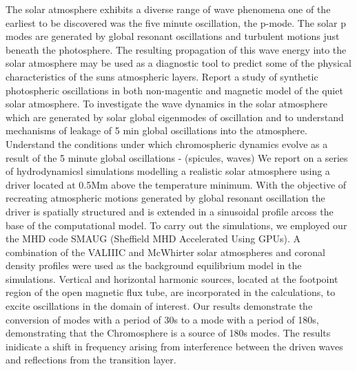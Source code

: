 \documentclass{aa}
\begin{document}
  \abstract
   { The solar atmosphere exhibits a diverse range of wave phenomena one of the earliest to be discovered was the five minute oscillation, the p-mode. The solar p modes are generated by global resonant oscillations and turbulent motions just beneath the photosphere. The resulting propagation of this wave energy into the solar atmosphere may be used as a diagnostic tool to predict some of the physical characteristics of the  suns atmospheric layers. Report a study of synthetic photospheric oscillations in both non-magentic and magnetic  model of the quiet solar atmosphere.}
   {To investigate the wave dynamics in the solar atmosphere which are generated by solar global eigenmodes of oscillation and to understand mechanisms of leakage of 5 min global oscillations into the atmosphere. Understand the conditions under which chromospheric dynamics evolve as a result of the 5 minute global oscillations - (spicules, waves)
}
   {  We report on a series of hydrodynamicsl simulations modelling a realistic solar atmosphere using a driver located at 0.5Mm above the temperature minimum. With the objective of recreating atmospheric motions generated by global resonant oscillation the driver is spatially structured and is extended in a sinusoidal profile arcoss the base of the computational model.  To carry out the simulations, we employed our the MHD code SMAUG (Sheffield MHD Accelerated Using GPUs). A combination of the VALIIIC and McWhirter solar atmospheres and coronal density profiles were used as the background equilibrium
model in the simulations. Vertical and horizontal harmonic sources, located at the footpoint region of the open magnetic flux tube, are incorporated in the calculations, to excite oscillations in the domain of interest.}
   {Our results demonstrate the conversion of modes with a period of 30s to a mode with a period of 180s, demonstrating that the Chromosphere is a source of 180s modes. The results inidicate a shift in frequency arising from interference between the driven waves and reflections from the transition layer.}


   \maketitle
%
\end{document}
